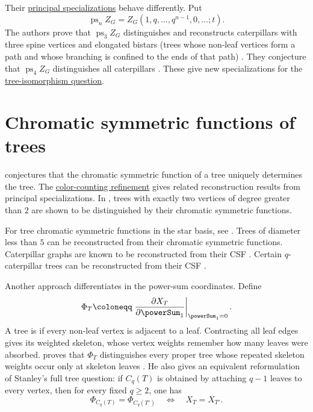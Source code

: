 Their \hyperref[standardSpecialization]{principal specializations}
behave differently. Put
\[
 \operatorname{ps}_n Z_G
 =Z_G(1,q,\dotsc,q^{n-1},0,\dotsc;t).
\]
The authors prove that $\operatorname{ps}_3 Z_G$ distinguishes and
reconstructs caterpillars with three spine vertices and elongated bistars
(trees whose non-leaf vertices form a path and whose branching is confined
to the ends of that path)
\cite[Thm.~4.1 and Thm.~5.1]{BinghamCelanoComminsOrellanaPanSimone2026x}.
They conjecture that $\operatorname{ps}_4 Z_G$ distinguishes all
caterpillars \cite[Conj.~6.1]{BinghamCelanoComminsOrellanaPanSimone2026x}.
These give new specializations for the
\hyperref[treesChromaticQuasisymmetric]{tree-isomorphism question}.

\section[treesChromaticQuasisymmetric]{Chromatic symmetric functions of trees}


 conjectures \cite{Stanley1995} that the chromatic
symmetric function of a tree uniquely determines the tree.
The \hyperref[colorCountingChromatic]{color-counting refinement} gives
related reconstruction results from principal specializations.
In \cite{WangYubZhang2023x}, trees with exactly two vertices of degree greater
than $2$ are shown to be distinguished by their chromatic symmetric functions.

For tree chromatic symmetric functions in the star basis, see
\cite{PrietoMierOrellanaZamora2023,GonzalezOrellanaTomba2024x}.
Trees of diameter less than $5$ can be reconstructed from their chromatic
symmetric functions.
Caterpillar graphs are known to be reconstructed from their CSF \cite{LoeblSereni2019}.
Certain $q$-caterpillar trees can be reconstructed from their CSF \cite{ArunkumarNarayananBVSawant2023x}.

Another approach differentiates in the power-sum coordinates.  Define
\[
  \Phi_T
  \coloneqq
  \left.\frac{\partial X_T}{\partial\powerSum_1}\right|_{\powerSum_1=0}.
\]
A tree is  if every non-leaf vertex is adjacent to a leaf.
Contracting all leaf edges gives its weighted skeleton, whose vertex weights
remember how many leaves were absorbed.   proves that
$\Phi_T$ distinguishes every proper tree whose repeated skeleton weights
occur only at skeleton leaves \cite[Thm.~1]{Awan2026x}.  He also gives an
equivalent reformulation of Stanley's full tree question: if $C_q(T)$ is
obtained by attaching $q-1$ leaves to every vertex, then for every fixed
$q\geq2$, one has \cite[Thm.~2]{Awan2026x}
\[
  \Phi_{C_q(T)}=\Phi_{C_q(T')}
  \quad\Longleftrightarrow\quad
  X_T=X_{T'}.
\]

